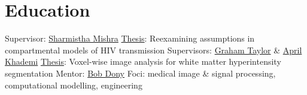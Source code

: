\section{Education}\twodate
{}
  \bullet Supervisor: \href{https://mishra-lab.ca}{Sharmistha Mishra}
  \bullet \href{https://hdl.handle.net/1807/129897}{Thesis}:
    Reexamining assumptions in compartmental models of HIV transmission
  \bullet Supervisors: \href{https://www.gwtaylor.ca}{Graham Taylor} \&
                       \href{https://www.torontomu.ca/akhademi}{April Khademi}
  \bullet \href{http://hdl.handle.net/10214/12142}{Thesis}:
    Voxel-wise image analysis for white matter hyperintensity segmentation
  \bullet Mentor: \href{https://www.uoguelph.ca/ceps/people/bob-dony}{Bob Dony}
  \bullet Foci: medical image \& signal processing, computational modelling, engineering
